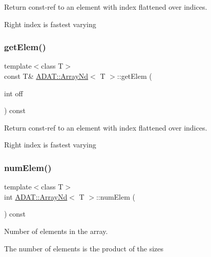 Return const-\/ref to an element with index flattened over indices. 

Right index is fastest varying \mbox{\label{classADAT_1_1ArrayNd_a515368f71387996ee237309eb1f0cc2e}} 
\subsubsection{\texorpdfstring{getElem()}{getElem()}\hspace{0.1cm}{\footnotesize\ttfamily [4/4]}}
{\footnotesize\ttfamily template$<$class T$>$ \\
const T\& \mbox{\hyperlink{classADAT_1_1ArrayNd}{A\+D\+A\+T\+::\+Array\+Nd}}$<$ T $>$\+::get\+Elem (\begin{DoxyParamCaption}\item[{int}]{off }\end{DoxyParamCaption}) const\hspace{0.3cm}{\ttfamily [inline]}}



Return const-\/ref to an element with index flattened over indices. 

Right index is fastest varying \mbox{\label{classADAT_1_1ArrayNd_a5c33ae0e66b53a2fd86f804f0f4292e9}} 
\subsubsection{\texorpdfstring{numElem()}{numElem()}\hspace{0.1cm}{\footnotesize\ttfamily [1/2]}}
{\footnotesize\ttfamily template$<$class T$>$ \\
int \mbox{\hyperlink{classADAT_1_1ArrayNd}{A\+D\+A\+T\+::\+Array\+Nd}}$<$ T $>$\+::num\+Elem (\begin{DoxyParamCaption}{ }\end{DoxyParamCaption}) const\hspace{0.3cm}{\ttfamily [inline]}}



Number of elements in the array. 

The number of elements is the product of the sizes \mbox{\label{classADAT_1_1ArrayNd_a5c33ae0e66b53a2fd86f804f0f4292e9}} 
